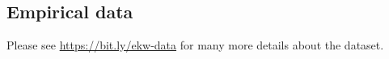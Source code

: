 \subsection{Empirical data}\label{Empirical data}
Please see \url{https://bit.ly/ekw-data} for many more details about the dataset.
